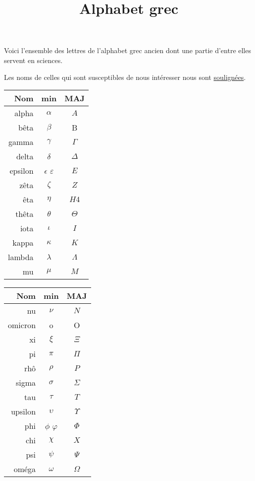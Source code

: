 \documentclass[a4paper,12pt]{scrartcl}
\date{}
\title{Alphabet grec}
\begin{document}
\maketitle


Voici l'ensemble des lettres de l'alphabet grec ancien dont une partie d'entre elles servent en sciences.

Les noms de celles qui sont susceptibles de nous intéresser nous sont \underline{soulignées}.

\LARGE
\begin{multicols}{2}
\begin{tabular}{r|c|c}
\textbf{Nom} & \textbf{min} & \textbf{MAJ}  \\ \hline
{alpha} & \underline{$\alpha$} & $A$ \\ 
{bêta} & \underline{$\beta$} & B \\ 
{gamma} & \underline{$\gamma$} & $\Gamma$ \\ 
{delta} & \underline{$\delta$} & \underline{$\Delta$} \\ 
{epsilon} & $\epsilon$ \underline{$\varepsilon$} & $E$ \\ 
zêta & $\zeta$ & $Z$ \\ 
êta & $\eta$ & $H4$ \\ 
{thêta} & \underline{$\theta$} & $\Theta$ \\ 
iota & $\iota$ & $I$ \\ 
kappa & $\kappa$ & $K$ \\ 
{lambda} & \underline{$\lambda$} & $\Lambda$ \\ 
{mu} & \underline{$\mu$} & $M$ \\ 
\end{tabular}

\begin{tabular}{r|c|c}
\textbf{Nom} & \textbf{min} & \textbf{MAJ}  \\ \hline
nu & $\nu$ & $N$ \\ 
omicron & o & O \\
xi & $\xi$ & $\Xi$ \\ 
{pi} & \underline{$\pi$} & $\Pi$ \\ 
{rhô} & \underline{$\rho$} & $P$ \\ 
{sigma} & \underline{$\sigma$} & \underline{$\Sigma$} \\ 
{tau} & $\tau$ & $T$ \\ 
upsilon & $\upsilon$ & $\Upsilon$ \\ 
{phi} & $\phi$ \underline{$\varphi$} & $\Phi$ \\ 
chi & $\chi$ & $X$ \\ 
psi & $\psi$ & $\Psi$ \\ 
{oméga} & \underline{$\omega$} & $\Omega$ \\
\end{tabular}
\end{multicols}
\end{document}
